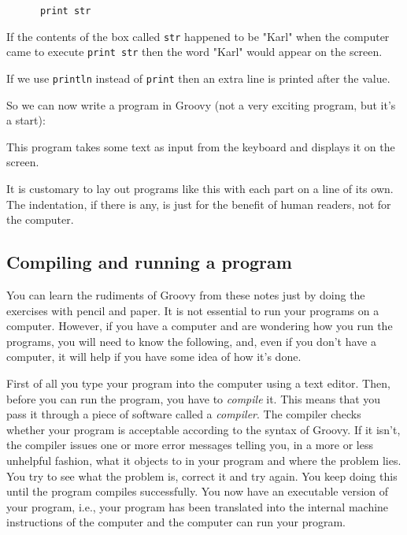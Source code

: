 \begin{Verbatim}
      print str
\end{Verbatim}

If the contents of the box called \verb!str! happened to be "Karl" when the
computer came to execute \verb!print str! then the word "Karl" would appear
on the screen.  

If we use \verb!println! instead of \verb!print! then an extra line is
printed after the value. 

So we can now write a program in Groovy (not a very exciting program,
but it's a start):


This program takes some text as input from the keyboard and displays it
on the screen.

It is customary to lay out programs like this with each part on a line 
of its own. The indentation, if there is any, is just for the benefit
of human readers, not for the computer.

\subsection{Compiling and running a program}

You can learn the rudiments of Groovy from these notes just by doing the
exercises with pencil and paper.  It is not essential to run your programs
on a computer.  However, if you have a computer and are wondering how
you run the programs, you will need to know the following, and, even if you don't have
a computer, it will help if you have some idea of how it's done.

First of all you type your program into the computer using a text
editor. Then, 
before you can run the program, you have to \emph{compile} it.  This means that
you pass it through a piece
of software called a \emph{compiler}.  The compiler checks whether your program
is acceptable according to the syntax of Groovy.  If it isn't, the compiler
issues one or more error messages telling you, in a more or less unhelpful
fashion, what it objects to in your program and where the problem lies.
You try to see what the problem is, correct it and try again.  You keep
doing this until the program compiles successfully.  You now have an
executable version of your program, i.e., your program has been translated
into the internal machine instructions of the computer and the computer
can run your program.

